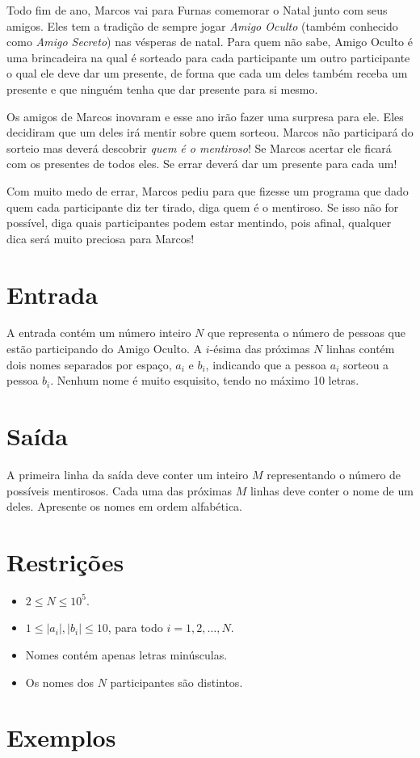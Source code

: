 Todo fim de ano, Marcos vai para Furnas comemorar o Natal junto com seus amigos.
Eles tem a tradição de sempre jogar \textit{Amigo Oculto} (também conhecido como 
\textit{Amigo Secreto}) nas vésperas de natal. Para quem não sabe, Amigo Oculto
é uma brincadeira na qual é sorteado para cada participante um outro participante
o qual ele deve dar um presente, de forma que cada um deles também receba um presente e que ninguém tenha que dar presente para si mesmo. 

Os amigos de Marcos inovaram e esse ano irão fazer uma surpresa para ele. Eles decidiram
que um deles irá mentir sobre quem sorteou. Marcos não participará do sorteio mas
deverá descobrir \textit{quem é o mentiroso}! Se Marcos acertar ele ficará com os
presentes de todos eles. Se errar deverá dar um presente para cada um! 

Com muito medo de errar, Marcos pediu para que fizesse um programa que dado quem
cada participante diz ter tirado, diga quem é o mentiroso. Se isso não for possível,
diga quais participantes podem estar mentindo, pois afinal, qualquer dica será
muito preciosa para Marcos!

\section*{Entrada}

A entrada contém um número inteiro $N$ que representa o número de pessoas que estão
participando do Amigo Oculto. A $i$-ésima das próximas $N$ linhas contém dois nomes separados por espaço, $a_i$ e $b_i$,
indicando que a pessoa $a_i$ sorteou a pessoa $b_i$.
Nenhum nome é muito esquisito, tendo no máximo 10 letras.

\section*{Saída}

A primeira linha da saída deve conter um inteiro $M$ representando o número de possíveis mentirosos. Cada uma das próximas $M$ linhas deve
conter o nome de um deles. Apresente os nomes em ordem alfabética.

\section*{Restrições}

\begin{itemize}
\item $2 \le N \le 10^5$.
\item $1 \le |a_i|, |b_i| \le 10$, para todo $i=1,2,\ldots,N$.
\item Nomes contém apenas letras minúsculas. 
\item Os nomes dos $N$ participantes são distintos.
\end{itemize}

\section*{Exemplos}

\exemplo
